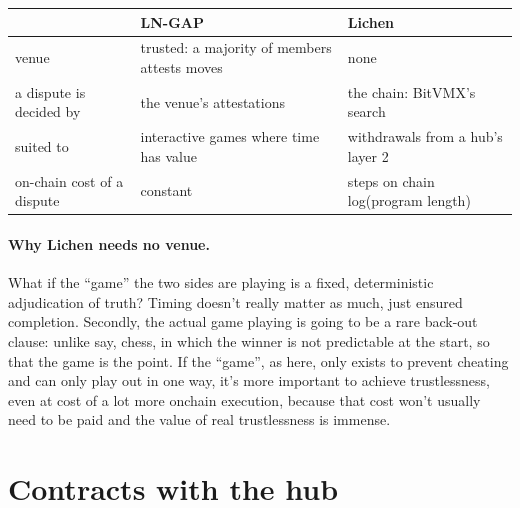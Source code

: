 \documentclass[11pt]{article}
\begin{document}
\begin{center}
\small
\begin{tabularx}{\linewidth}{p{24mm}LL}
\toprule
& LN-GAP &  Lichen  \\
\midrule
venue & trusted: a majority of members attests moves & none \\
a dispute is decided by & the venue's attestations  & the chain: BitVMX's search \\
suited to & interactive games where time has value  & withdrawals from a hub's layer 2 \\
on-chain cost of a dispute & constant & steps on chain log(program length) \\
\bottomrule
\end{tabularx}
\end{center}

\paragraph{Why Lichen needs no venue.}  What if the ``game'' the two sides are playing is a fixed, deterministic adjudication of truth? Timing doesn't really matter as much, just ensured completion. Secondly, the actual game playing is going to be a rare back-out clause: unlike say, chess, in which the winner is not predictable at the start, so that the game is the point. If the ``game'', as here, only exists to prevent cheating and can only play out in one way, it's more important to achieve trustlessness, even at cost of a lot more onchain execution, because that cost won't usually need to be paid and the value of real trustlessness is immense.

\section{Contracts with the hub}
\label{sec:terms}
\end{document}
